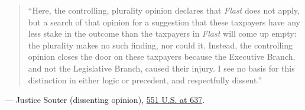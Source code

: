 \documentclass[12pt]{article}
\begin{document}
\begin{quote}
``Here, the controlling, plurality opinion declares that \textit{Flast} does not apply, but a search of that opinion for a suggestion that these taxpayers have any less stake in the outcome than the taxpayers in \textit{Flast} will come up empty: the plurality makes no such finding, nor could it. Instead, the controlling opinion closes the door on these taxpayers because the Executive Branch, and not the Legislative Branch, caused their injury. I see no basis for this distinction in either logic or precedent, and respectfully dissent.''
\end{quote}
\noindent --- Justice Souter (dissenting opinion), \href{https://supreme.justia.com/cases/federal/us/551/587/}{551 U.S. at 637}.
\end{document}
